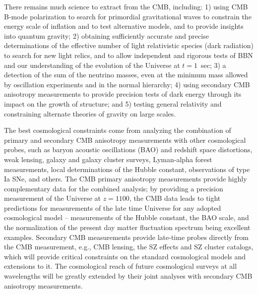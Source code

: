There remains much science to extract from the CMB, including: 1) using CMB B-mode polarization to search for primordial gravitational waves to constrain the energy scale of inflation and to test alternative models, and to provide insights into quantum gravity; 2) obtaining sufficiently accurate and precise determinations of the effective number of light relativistic species (dark radiation) to search for new light relics, and to allow independent and rigorous tests of BBN and our understanding of the evolution of the Universe at $t = 1$\ sec; 3) a detection of the sum of the neutrino masses, even at the minimum mass allowed by oscillation experiments and in the normal hierarchy; 4) using secondary CMB anisotropy measurements to provide precision tests of dark energy through its impact on the growth of structure; and 5) testing general relativity and constraining alternate theories of gravity on large scales.

The best cosmological constraints come from analyzing the combination of primary and secondary CMB anisotropy measurements with other cosmological probes, such as baryon acoustic oscillations (BAO) and redshift space distortions, weak lensing, galaxy and galaxy cluster surveys, Lyman-alpha forest measurements, local determinations of the Hubble constant, observations of type Ia SNe, and others. The CMB primary anisotropy measurements provide highly complementary data for the combined analysis;  by providing a precision measurement of the Universe at $z = 1100$, the CMB data leads to tight predictions for measurements of the late time Universe for any adopted cosmological model  -- measurements of the Hubble constant, the BAO scale, and the normalization of the present day matter fluctuation spectrum being excellent examples. Secondary CMB measurements provide late-time probes directly from the CMB measurement, e.g., CMB lensing, the SZ effects and SZ cluster catalogs, which will provide critical constraints on the standard cosmological models and extensions to it. The cosmological reach of future cosmological surveys at all wavelengths will be greatly extended by their joint analyses with secondary CMB anisotropy measurements. 



